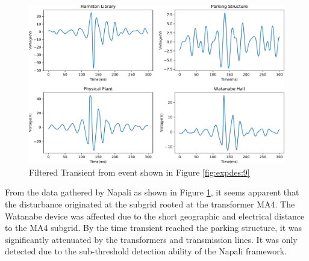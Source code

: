 \begin{figure}[ht!]
    \centering
    \includegraphics[width=1\linewidth]{img/deployment/gridwide_locality.pdf}
    \caption{Filtered Transient from event shown in Figure \ref{fig:expdes:9}}
    \label{expdes:fig:grid_wide_filtered}
\end{figure}

From the data gathered by Napali as shown in Figure \ref{expdes:fig:grid_wide_filtered}, it seems apparent that the disturbance originated at the subgrid rooted at the transformer MA4.
The Watanabe device was affected due to the short geographic and electrical distance to the MA4 subgrid.
By the time transient reached the parking structure, it was significantly attenuated by the transformers and transmission lines.
It was only detected due to the sub-threshold detection ability of the Napali framework.

